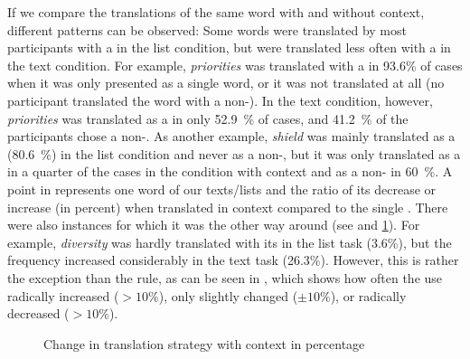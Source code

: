 \documentclass[output=paper]{LSP/langsci}
\begin{document}
If we compare the translations of the same word with and without context, different patterns can be observed: Some words were translated by most participants with a  in the list condition, but were translated less often with a  in the text condition. For example, \textit{priorities} was translated with a  in 93.6\% of cases when it was only presented as a single word, or it was not translated at all (no participant translated the word with a non-). In the text condition, however, \textit{priorities} was translated as a  in only 52.9~\% of cases, and 41.2~\% of the participants chose a non-. As another example, \textit{shield} was mainly translated as a  (80.6~\%) in the list condition and never as a non-, but it was only translated as a  in a quarter of the cases in the condition with context and as a non- in 60~\%. A point in  represents one word of our texts/lists and the ratio of its decrease or increase (in percent) when translated in context compared to the single . There were also instances for which it was the other way around (see  and \ref{hansenschirraetal:fig:6}). For example, \textit{diversity} was hardly translated with its  in the list task (3.6\%), but the frequency increased considerably in the text task (26.3\%). However, this is rather the exception than the rule, as can be seen in , which shows how often the  use radically increased ($>10\%$), only slightly changed ($\pm 10\%$), or radically decreased ($>10\%$).

\begin{figure}

\caption{Change in translation strategy with context in percentage}
\label{hansenschirraetal:fig:6}
\end{figure} 
\end{document}
